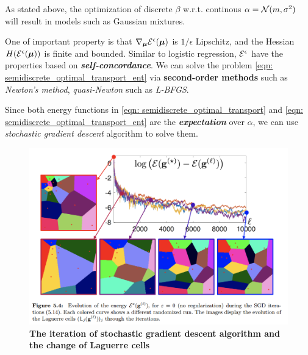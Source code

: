 \documentclass[11pt]{article}
\begin{document}
As stated above, the optimization of discrete $\beta$ w.r.t. continous $\alpha = {\mathcal N}(m, \sigma^2)$ will result in models such as Gaussian mixtures. 

One of important property is that $\nabla_{\boldsymbol{\mu}}{{\mathcal E}^{\epsilon}(\boldsymbol{\mu})}$ is $1/\epsilon$ Lipschitz, and the Hessian $H({\mathcal E}^{\epsilon}(\boldsymbol{\mu}))$  is finite and bounded. Similar to logistic regression, ${\mathcal E}^{\epsilon}$ have the properties based on \textbf{\emph{self-concordance}}. We can solve the problem \eqref{eqn: semidiscrete_optimal_transport_ent} via \textbf{second-order methods} such as \emph{Newton's method}, \emph{quasi-Newton} such as \emph{L-BFGS}. 

Since both energy functions in  \eqref{eqn: semidiscrete_optimal_transport} and \eqref{eqn: semidiscrete_optimal_transport_ent} are the \emph{\textbf{expectation}} over $\alpha$, we can use \emph{stochastic gradient descent} algorithm to solve them.


\begin{figure}
\begin{minipage}[t]{1\linewidth}
  \centering
  \centerline{\includegraphics[scale = 0.4]{sgd_semidiscrete.png}}
\end{minipage}
\caption{\footnotesize{\textbf{The iteration of stochastic gradient descent algorithm and the change of Laguerre cells \citep{gabriel2019computational}}}}
\label{fig: sgd_semidiscrete}
\end{figure}

\newpage


\end{document}
